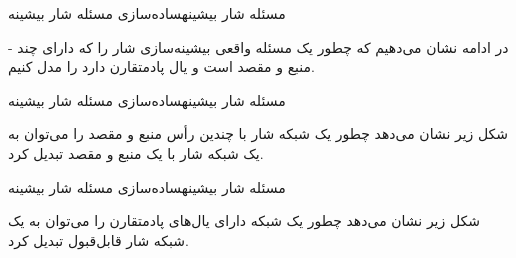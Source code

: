 \begin{itemframe}{مسئله شار بیشینه}{ساده‌سازی مسئله شار بیشینه}
\item[-]
در ادامه نشان می‌دهیم که چطور یک مسئله واقعی بیشینه‌سازی شار را که دارای چند منبع و مقصد است و یال پادمتقارن دارد را مدل کنیم.

\end{itemframe}

\begin{itemframe}{مسئله شار بیشینه}{ساده‌سازی مسئله شار بیشینه}
\item
شکل زیر نشان می‌دهد چطور یک شبکه شار با چندین رأس منبع و مقصد را می‌توان به یک شبکه شار با یک منبع و مقصد تبدیل کرد.

\end{itemframe}

\begin{itemframe}{مسئله شار بیشینه}{ساده‌سازی مسئله شار بیشینه}
\item
شکل زیر نشان می‌دهد چطور یک شبکه دارای یال‌های پادمتقارن را می‌توان به یک شبکه شار قابل‌قبول تبدیل کرد.
\end{itemframe}